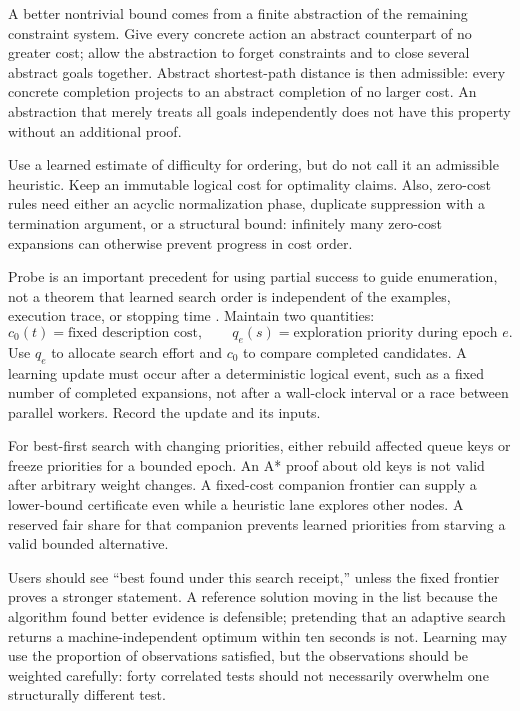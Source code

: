 A better nontrivial bound comes from a finite abstraction of the remaining
constraint system. Give every concrete action an abstract counterpart of no
greater cost; allow the abstraction to forget constraints and to close several
abstract goals together. Abstract shortest-path distance is then admissible:
every concrete completion projects to an abstract completion of no larger
cost. An abstraction that merely treats all goals independently does not have
this property without an additional proof.

Use a learned estimate of difficulty for ordering, but do not call it an
admissible heuristic. Keep an immutable logical cost for optimality claims.
Also, zero-cost rules need either an acyclic normalization phase, duplicate
suppression with a termination argument, or a structural bound: infinitely
many zero-cost expansions can otherwise prevent progress in cost order.


Probe is an important precedent for using partial success to guide enumeration,
not a theorem that learned search order is independent of the examples,
execution trace, or stopping time \cite{probe}. Maintain two quantities:
\[
 c_0(t)=\text{fixed description cost},\qquad
 q_e(s)=\text{exploration priority during epoch }e.
\]
Use $q_e$ to allocate search effort and $c_0$ to compare completed candidates.
A learning update must occur after a deterministic logical event, such as a
fixed number of completed expansions, not after a wall-clock interval or a
race between parallel workers. Record the update and its inputs.

For best-first search with changing priorities, either rebuild affected queue
keys or freeze priorities for a bounded epoch. An A* proof about old keys is
not valid after arbitrary weight changes. A fixed-cost companion frontier can
supply a lower-bound certificate even while a heuristic lane explores other
nodes. A reserved fair share for that companion prevents learned priorities
from starving a valid bounded alternative.

Users should see ``best found under this search receipt,'' unless the fixed
frontier proves a stronger statement. A reference solution moving in the list
because the algorithm found better evidence is defensible; pretending that an
adaptive search returns a machine-independent optimum within ten seconds is
not. Learning may use the proportion of observations satisfied, but the
observations should be weighted carefully: forty correlated tests should not
necessarily overwhelm one structurally different test.

